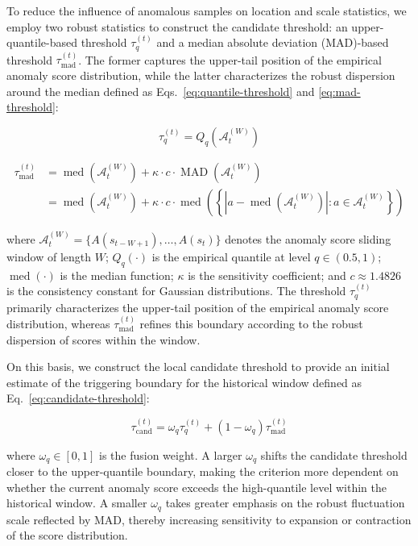 ﻿\documentclass[preprint,12pt,number]{elsarticle}
\begin{document}
To reduce the influence of anomalous samples on location and scale statistics, we employ two robust statistics to construct the candidate threshold: an upper-quantile-based threshold \(\tau_q^{(t)}\) and a median absolute deviation (MAD)-based threshold \(\tau_{\mathrm{mad}}^{(t)}\). The former captures the upper-tail position of the empirical anomaly score distribution, while the latter characterizes the robust dispersion around the median defined as Eqs.~\eqref{eq:quantile-threshold} and \eqref{eq:mad-threshold}:

\[\tau_{q}^{(t)}=Q_q(\mathcal{A}_t^{(W)}) \tag{9}\label{eq:quantile-threshold}\]

\[\begin{aligned}
\tau_{\mathrm{mad}}^{(t)} &= \operatorname{med}(\mathcal{A}_t^{(W)})+\kappa \cdot c \cdot \operatorname{MAD}(\mathcal{A}_t^{(W)}) \\
&= \operatorname{med}(\mathcal{A}_t^{(W)})+\kappa \cdot c \cdot\operatorname{med}\left(\left\{\left|a-\operatorname{med}(\mathcal{A}_t^{(W)})\right|:a\in\mathcal{A}_{t}^{(W)}\right\}\right)
\end{aligned} \tag{10}\label{eq:mad-threshold}\]

\noindent where \(\mathcal{A}_t^{(W)}=\{A(s_{t-W+1}),\ldots,A(s_t)\}\) denotes the anomaly score sliding window of length \(W\); \(Q_q(\cdot)\) is the empirical quantile at level \(q\in(0.5,1)\); \(\operatorname{med}(\cdot)\) is the median function; \(\kappa\) is the sensitivity coefficient; and \(c \approx 1.4826\) is the consistency constant for Gaussian distributions. The threshold \(\tau_q^{(t)}\) primarily characterizes the upper-tail position of the empirical anomaly score distribution, whereas \(\tau_{\mathrm{mad}}^{(t)}\) refines this boundary according to the robust dispersion of scores within the window.

On this basis, we construct the local candidate threshold to provide an initial estimate of the triggering boundary for the historical window defined as Eq.~\eqref{eq:candidate-threshold}:

\[\tau_{\mathrm{cand}}^{(t)}=\omega_q\tau_q^{(t)}+(1-\omega_q)\tau_{\mathrm{mad}}^{(t)} \tag{11}\label{eq:candidate-threshold}\]

\noindent where \(\omega_q \in [0,1]\) is the fusion weight. A larger \(\omega_q\) shifts the candidate threshold closer to the upper-quantile boundary, making the criterion more dependent on whether the current anomaly score exceeds the high-quantile level within the historical window. A smaller \(\omega_q\) takes greater emphasis on the robust fluctuation scale reflected by MAD, thereby increasing sensitivity to expansion or contraction of the score distribution.
\end{document}
